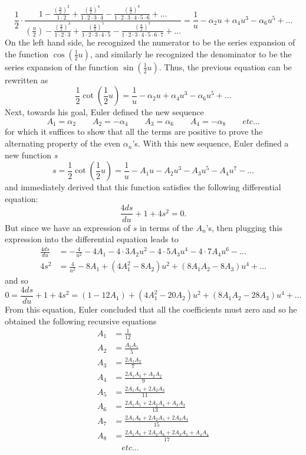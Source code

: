 \begin{equation}
    \frac{1}{2}\cdot\frac{1 - \frac{(\frac{u}{2})^2}{1\cdot 2} + \frac{(\frac{u}{2})^4}{1\cdot 2 \cdot 3 \cdot 4} - \frac{(\frac{u}{2})^6}{1\cdot 2 \cdot 3 \cdot 4 \cdot 5 \cdot 6} + \dots}{(\frac{u}{2}) - \frac{(\frac{u}{2})^3}{1 \cdot 2 \cdot 3} + \frac{(\frac{u}{2})^5}{1\cdot 2 \cdot 3 \cdot 4 \cdot 5} - \frac{(\frac{u}{2})^7}{1 \cdot 2 \cdot 3 \cdot 4 \cdot 5 \cdot 6 \cdot 7} + \dots} = \frac{1}{u} - \alpha_2 u + \alpha_4 u^3 - \alpha_6 u^5 + \dots
\end{equation}
On the left hand side, he recognized the numerator to be the series expansion of the function $\cos(\frac{1}{2}u)$, and similarly he recognized the denominator to be the series expansion of the function $\sin(\frac{1}{2}u)$. Thus, the previous equation can be rewritten as 
\begin{equation} \label{cotangent alpha}
    \frac{1}{2}\cot\left(\frac{1}{2}u\right) = \frac{1}{u} - \alpha_2 u + \alpha_4 u^3 - \alpha_6 u^5 + \dots
\end{equation}
Next, towards his goal, Euler defined the new sequence
$$A_1 = \alpha_2 \qquad A_2 = - \alpha_4 \qquad A_3 = \alpha_6 \qquad A_4 = - \alpha_8 \qquad etc... $$
for which it suffices to show that all the terms are positive to prove the alternating property of the even $\alpha_n$'s. With this new sequence, Euler defined a new function $s$
\begin{equation}
    s = \frac{1}{2}\cot\left(\frac{1}{2}u\right) = \frac{1}{u} - A_1 u - A_2u^3 - A_3 u^5 - A_4 u^7 - \dots
\end{equation}
and immediately derived that this function satisfies the following differential equation:
\begin{equation}
    \frac{4ds}{du} + 1 + 4s^2 = 0.
\end{equation}
But since we have an expression of $s$ in terms of the $A_n$'s, then plugging this expression into the differential equation leads to
\begin{align*}
    \frac{4ds}{du} &= -\frac{4}{u^2} - 4A_1 - 4\cdot 3 A_2 u^2 - 4\cdot 5 A_3u^4 - 4\cdot 7 A_4 u^6 - \dots \\
    4s^2 &= \frac{4}{u^2}  - 8A_1 + (4A_1^2 - 8A_2)u^2 + (8A_1A_2 - 8A_3)u^4 + \dots
\end{align*}
and so
$$0 = \frac{4ds}{du} + 1 + 4s^2 = (1 - 12A_1) + (4A_1^2 - 20A_2)u^2 + (8A_1A_2 - 28A_3)u^4 + \dots$$
From this equation, Euler concluded that all the coefficients must zero and so he obtained the following recursive equations
\begin{align*}
    A_1 &= \frac{1}{12} \\
    A_2 &= \frac{A_1A_1}{5} \\
    A_3 &= \frac{2A_1A_2}{7} \\
    A_4 &= \frac{2A_1 A_3 + A_2A_2}{9} \\
    A_5 &= \frac{2A_1 A_4 + 2 A_2 A_3}{11} \\
    A_6 &= \frac{2 A_1 A_5 + 2A_2 A_4 + A_3A_3}{13} \\
    A_7 &= \frac{2A_1 A_6 + 2A_2 A_5 + 2A_3 A_4}{15} \\
    A_8 &= \frac{2A_1A_7 + 2A_2 A_6 + 2A_3 A_5 + A_4A_4}{17} \\
    & \quad etc \dots
\end{align*}
